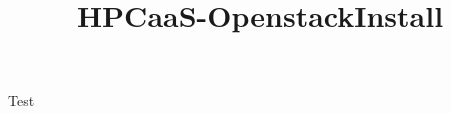 \documentclass[letterpaper]{article}
\title{HPCaaS-OpenstackInstall}
\begin{document}
	
Test
	
	
	
	
	
	
	
\end{document}
